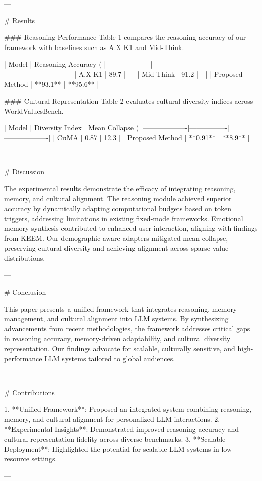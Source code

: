 ---

# Results

### Reasoning Performance
Table 1 compares the reasoning accuracy of our framework with baselines such as A.X K1 and Mid-Think.

| Model            | Reasoning Accuracy (%
|-------------------|------------------------|----------------------------|
| A.X K1           | 89.7                  | -                          |
| Mid-Think        | 91.2                  | -                          |
| Proposed Method  | **93.1**              | **95.6**                   |

### Cultural Representation
Table 2 evaluates cultural diversity indices across WorldValuesBench.

| Model            | Diversity Index | Mean Collapse (%
|-------------------|----------------|-------------------|
| CuMA             | 0.87           | 12.3             |
| Proposed Method  | **0.91**       | **8.9**          |

---

# Discussion

The experimental results demonstrate the efficacy of integrating reasoning, memory, and cultural alignment. The reasoning module achieved superior accuracy by dynamically adapting computational budgets based on token triggers, addressing limitations in existing fixed-mode frameworks. Emotional memory synthesis contributed to enhanced user interaction, aligning with findings from KEEM. Our demographic-aware adapters mitigated mean collapse, preserving cultural diversity and achieving alignment across sparse value distributions.

---

# Conclusion

This paper presents a unified framework that integrates reasoning, memory management, and cultural alignment into LLM systems. By synthesizing advancements from recent methodologies, the framework addresses critical gaps in reasoning accuracy, memory-driven adaptability, and cultural diversity representation. Our findings advocate for scalable, culturally sensitive, and high-performance LLM systems tailored to global audiences.

---

# Contributions 

1. **Unified Framework**: Proposed an integrated system combining reasoning, memory, and cultural alignment for personalized LLM interactions.
2. **Experimental Insights**: Demonstrated improved reasoning accuracy and cultural representation fidelity across diverse benchmarks.
3. **Scalable Deployment**: Highlighted the potential for scalable LLM systems in low-resource settings.

---

